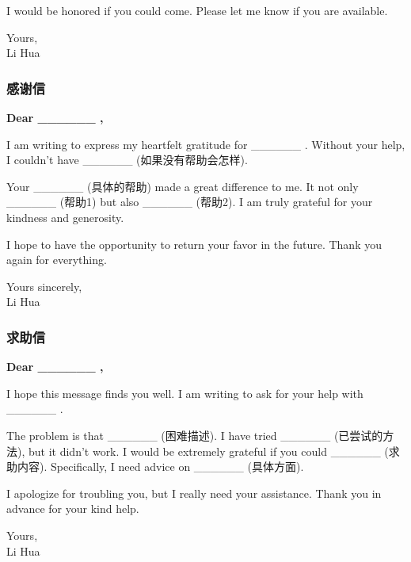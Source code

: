 I would be honored if you could come. Please let me know if you are available.

\begin{center}
Yours,\\
Li Hua
\end{center}

\subsubsection{感谢信}

\begin{center}
\textbf{Dear \_\_\_\_\_\_ ,}
\end{center}

I am writing to express my heartfelt gratitude for \_\_\_\_\_\_ . Without your help, I couldn't have \_\_\_\_\_\_ (如果没有帮助会怎样).

Your \_\_\_\_\_\_ (具体的帮助) made a great difference to me. It not only \_\_\_\_\_\_ (帮助1) but also \_\_\_\_\_\_ (帮助2). I am truly grateful for your kindness and generosity.

I hope to have the opportunity to return your favor in the future. Thank you again for everything.

\begin{center}
Yours sincerely,\\
Li Hua
\end{center}

\subsubsection{求助信}

\begin{center}
\textbf{Dear \_\_\_\_\_\_ ,}
\end{center}

I hope this message finds you well. I am writing to ask for your help with \_\_\_\_\_\_ .

The problem is that \_\_\_\_\_\_ (困难描述). I have tried \_\_\_\_\_\_ (已尝试的方法), but it didn't work. I would be extremely grateful if you could \_\_\_\_\_\_ (求助内容). Specifically, I need advice on \_\_\_\_\_\_ (具体方面).

I apologize for troubling you, but I really need your assistance. Thank you in advance for your kind help.

\begin{center}
Yours,\\
Li Hua
\end{center}

